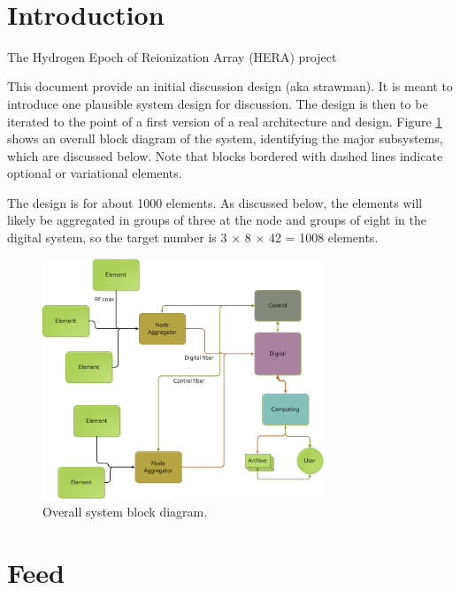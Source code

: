 \documentclass[11pt]{article}
\begin{document}
{ \\}
{
}
\vspace*{0.5cm}


\section{Introduction}

The Hydrogen Epoch of Reionization Array (HERA) project 

This document provide an initial discussion design (aka strawman).  It is meant
to introduce one plausible system design for discussion.  The design is then to
be iterated to the point of a first version of a real architecture and design.
Figure \ref{fig:overall} shows an overall block diagram of the system,
identifying the major subsystems, which are discussed below.  Note that blocks
bordered with dashed lines indicate optional or variational elements.

The design is for about 1000 elements.  As discussed below, the elements will
likely be aggregated in groups of three at the node and groups of eight in the
digital system, so the target number is 3 $\times$ 8 $\times$ 42 = 1008
elements.

\begin{figure}[h]
\centering
\includegraphics[width=0.75\textwidth]{plots/Overall.png}
\caption{Overall system block diagram.}
\label{fig:overall}
\end{figure}

\section{Feed}
\label{sec:feed}
\end{document}
